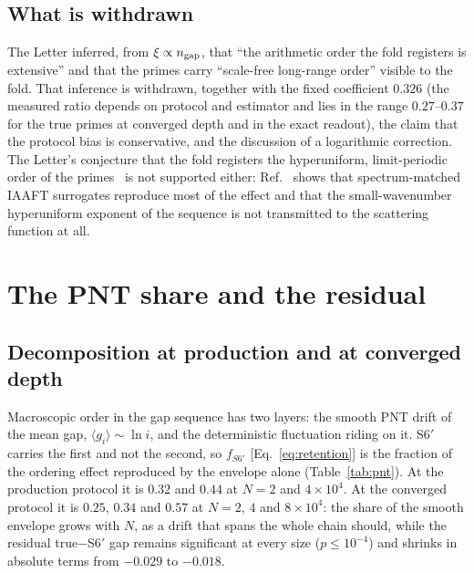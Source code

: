 \documentclass[reprint,amsmath,amssymb,aps,pre,longbibliography]{revtex4-2}
\begin{document}
\subsection{What is withdrawn}

The Letter inferred, from $\xi\propto n_{\rm gap}$, that ``the arithmetic order the fold
registers is extensive'' and that the primes carry ``scale-free long-range order'' visible
to the fold. That inference is withdrawn, together with the fixed coefficient $0.326$ (the
measured ratio depends on protocol and estimator and lies in the range $0.27$--$0.37$ for
the true primes at converged depth and in the exact readout), the claim that the protocol
bias is conservative, and the discussion of a logarithmic correction. The Letter's
conjecture that the fold registers the hyperuniform, limit-periodic order of the
primes~\cite{Torquato2018,Torquato2019} is not supported either: Ref.~\cite{PDTP4} shows
that spectrum-matched IAAFT surrogates reproduce most of the effect and that the
small-wavenumber hyperuniform exponent of the sequence is not transmitted to the
scattering function at all.

\section{The PNT share and the residual}\label{sec:pnt}

\subsection{Decomposition at production and at converged depth}

Macroscopic order in the gap sequence has two layers: the smooth PNT drift of the mean gap,
$\langle g_i\rangle\sim\ln i$, and the deterministic fluctuation riding on it. S6$'$
carries the first and not the second, so $f_{S6'}$ [Eq.~\eqref{eq:retention}] is the
fraction of the ordering effect reproduced by the envelope alone
(Table~\ref{tab:pnt}). At the production protocol it is $0.32$ and $0.44$ at
$N=2$ and $4\times10^{4}$. At the converged protocol it is $0.25$, $0.34$ and $0.57$ at
$N=2$, $4$ and $8\times10^{4}$: the share of the smooth envelope grows with $N$, as a drift
that spans the whole chain should, while the residual true$-$S6$'$ gap remains significant
at every size ($p\le10^{-4}$) and shrinks in absolute terms from $-0.029$ to $-0.018$.
\end{document}
